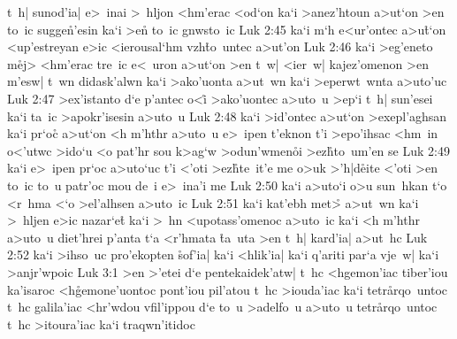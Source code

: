 t~h|
sunod'ia|
e>~inai
>~hljon
<hm'erac
<od`on
ka`i
>anez'htoun
a>ut`on
>en
to~ic
sugge\r{n}'esin
ka`i
>e\r{n}
to~ic
gnwsto~ic\bibvsend
\vs Luk 2:45
ka`i
m`h
e<ur'ontec
a>u\r{t}`on
<up'estreyan
e>ic
<ierousal`hm
vzh\r{t}o~untec
a>ut'on\bibvsend
\vs Luk 2:46
ka`i
>eg'eneto
m\r{e}j>
<hm'erac
tre~ic
e<~uron
a>ut`on
>en
t~w|
<ier~w|
kajez'omenon
>en
m'esw|
t~wn
didask'alwn
ka`i
>ako'uonta
a>ut~wn
ka`i
>eperwt~wnta
a>uto'uc\bibvsend
\vs Luk 2:47
>ex'istanto
d`e
p'antec
o<i\r{}
>ako'uontec
a>uto~u
>ep`i
t~h|
sun'esei
ka`i
ta~ic
>apokr'isesin
a>uto~u\bibvsend
\vs Luk 2:48
ka`i
>id'ontec
a>ut`on
>exepl'aghsan
ka`i
pr`oc\r{}
a>ut`on
<h
m'hthr
a>uto~u
e>~ipen
t'eknon
t'i
>epo'ihsac
<hm~in
o<'utwc
>ido`u
<o
pat'hr
sou
k>ag`w
>odun'wmen\r{o}i
>ez\r{h}to~um'en
se\bibvsend
\vs Luk 2:49
ka`i
e>~ipen
pr`oc
a>uto`uc
t'i
<'oti
>ez\r{h}te~it'e
me
o>uk
>'h|d\r{e}ite
<'oti
>en
to~ic
to~u
patr'oc
mou
de~i
e>~ina'i
me\bibvsend
\vs Luk 2:50
ka`i
a>uto`i
o>u
sun~hkan
t`o
<r~hma
<`o
>el'alhsen
a>uto~ic\bibvsend
\vs Luk 2:51
ka`i
kat'ebh
met>\r{}
a>ut~wn
ka`i
>~hljen
e>ic
nazar`e\r{t}
ka`i
>~hn
<upotass'omenoc
a>uto~ic
ka`i
<h
m'hthr
a>uto~u
diet'hrei
p'anta
t`a
<r'hmata
\r{t}a~uta
>en
t~h|
kard'ia|
a>ut~hc\bibvsend
\vs Luk 2:52
ka`i
>ihso~uc
pro'ekopten
\r{s}of'ia|
ka`i
<hlik'ia|
ka`i
q'ariti
par`a
vje~w|
ka`i
>anjr'wpoic\bibvsend
\vs Luk 3:1
>en
>'etei
d`e
pentekaidek'atw|
t~hc
<hgemon'iac
tiber'iou
ka'isaroc
<h\r{g}e\-mo\-ne'u\-on\-toc
pont'iou
pil'atou
t~hc
>iouda'iac
ka`i
tet\-r\r{a}r\-qo~un\-toc
t~hc
galila'iac
<hr'wdou
vfil'ippou
d`e
to~u
>adelfo~u
a>uto~u
te\-tr\r{a}\-rqo~un\-toc
t~hc
>itoura'iac
ka`i
traqwn'itidoc

